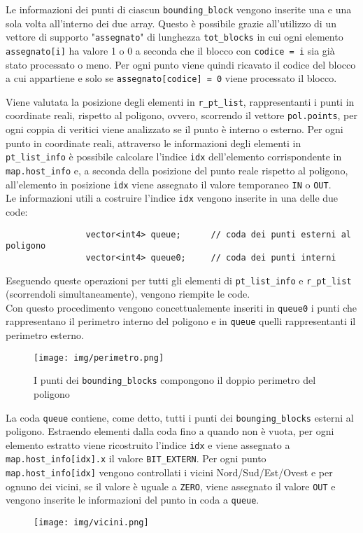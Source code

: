 			Le informazioni dei punti di ciascun \texttt{bounding\_block} vengono inserite una e una sola volta all'interno dei due array. Questo \`{e} possibile grazie all'utilizzo di un vettore di supporto "\texttt{assegnato}" di lunghezza \texttt{tot\_blocks} in cui ogni elemento \texttt{assegnato[i]} ha valore 1 o 0 a seconda che il blocco con \texttt{codice = i} sia gi\`{a} stato processato o meno.
			Per ogni punto viene quindi ricavato il codice del blocco a cui appartiene e solo se \texttt{assegnato[codice] = 0} viene processato il blocco.

			Viene valutata la posizione degli elementi in \texttt{r\_pt\_list}, rappresentanti i punti in coordinate reali, rispetto al poligono, ovvero, scorrendo il vettore \texttt{pol.points}, per ogni coppia di veritici viene analizzato se il punto \`{e} interno o esterno. Per ogni punto in coordinate reali, attraverso le informazioni degli elementi in \texttt{pt\_list\_info} \`{e} possibile calcolare l'indice \texttt{idx} dell'elemento corrispondente in \texttt{map.host\_info} e, a seconda della  posizione del punto reale rispetto al poligono, all'elemento in posizione \texttt{idx} viene assegnato il valore temporaneo \texttt{IN} o \texttt{OUT}.\\
			Le informazioni utili a costruire l'indice \texttt{idx} vengono inserite in una delle due code:
			\begin{verbatim}
				vector<int4> queue;      // coda dei punti esterni al poligono
				vector<int4> queue0;     // coda dei punti interni
			\end{verbatim} 
			Eseguendo queste operazioni per tutti gli elementi di \texttt{pt\_list\_info} e \texttt{r\_pt\_list} (scorrendoli simultaneamente), vengono riempite le code.\\
			Con questo procedimento vengono concettualemente inseriti in \texttt{queue0} i punti che rappresentano il perimetro interno del poligono e in \texttt{queue} quelli rappresentanti il perimetro esterno.
			\begin{figure}[htbp]
				\centering
				\texttt{[image: img/perimetro.png]}
				\caption{I punti dei \texttt{bounding\_blocks} compongono il doppio perimetro del poligono}
			\end{figure}
			
			La coda \texttt{queue} contiene, come detto, tutti i punti dei \texttt{bounging\_blocks} esterni al poligono. Estraendo elementi dalla coda fino a quando non \`{e} vuota, per ogni elemento estratto viene ricostruito l'indice \texttt{idx} e viene assegnato a \texttt{map.host\_info[idx].x} il valore \texttt{BIT\_EXTERN}. Per ogni punto \texttt{map.host\_info[idx]} vengono controllati i vicini Nord/Sud/Est/Ovest e per ognuno dei vicini, se il valore \`{e} uguale a \texttt{ZERO}, viene assegnato il valore \texttt{OUT} e vengono inserite le informazioni del punto in coda a \texttt{queue}.
			\begin{figure}[htbp]
				\centering
				\texttt{[image: img/vicini.png]}
			\end{figure}

